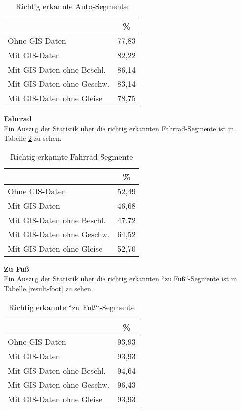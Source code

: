 \begin{table}[h]
\centering
\begin{tabular}{|l|c|}
\hline
 & \% \\ \hline
Ohne GIS-Daten & 77,83 \\ \hline
Mit GIS-Daten & 82,22 \\ \hline
Mit GIS-Daten ohne Beschl. & 86,14 \\ \hline
Mit GIS-Daten ohne Geschw. & 83,14 \\ \hline
Mit GIS-Daten ohne Gleise & 78,75 \\ \hline
\end{tabular}
\caption{Richtig erkannte Auto-Segmente}
\label{result-drive}
\end{table}

\textbf{Fahrrad} \\
Ein Auszug der Statistik über die richtig erkannten Fahrrad-Segmente ist in Tabelle \ref{result-bike} zu sehen.

\begin{table}[h]
\centering
\begin{tabular}{|l|c|}
\hline
 & \% \\ \hline
Ohne GIS-Daten & 52,49 \\ \hline
Mit GIS-Daten & 46,68 \\ \hline
Mit GIS-Daten ohne Beschl. & 47,72 \\ \hline
Mit GIS-Daten ohne Geschw. & 64,52 \\ \hline
Mit GIS-Daten ohne Gleise & 52,70 \\ \hline
\end{tabular}
\caption{Richtig erkannte Fahrrad-Segmente}
\label{result-bike}
\end{table}

\textbf{Zu Fuß} \\
Ein Auszug der Statistik über die richtig erkannten ``zu Fuß``-Segmente ist in Tabelle \ref{result-foot} zu sehen.

\begin{table}[h]
\centering
\begin{tabular}{|l|c|}
\hline
 & \% \\ \hline
Ohne GIS-Daten & 93,93 \\ \hline
Mit GIS-Daten & 93,93 \\ \hline
Mit GIS-Daten ohne Beschl. & 94,64 \\ \hline
Mit GIS-Daten ohne Geschw. & 96,43 \\ \hline
Mit GIS-Daten ohne Gleise & 93,93 \\ \hline
\end{tabular}
\caption{Richtig erkannte ``zu Fuß``-Segmente}
\label{resultat-foot}
\end{table}

